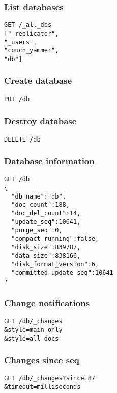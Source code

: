 \begin{multicols}{2}
  
\subsubsection{List databases}
\begin{lstlisting}
GET /_all_dbs 
["_replicator",
"_users",
"couch_yammer",
"db"]
\end{lstlisting}

\subsubsection{Create database}
\begin{lstlisting}
PUT /db
\end{lstlisting}

\subsubsection{Destroy database}
\begin{lstlisting}
DELETE /db
\end{lstlisting}
  
\subsubsection{Database information}
\begin{lstlisting}
GET /db
{
  "db_name":"db",
  "doc_count":188,
  "doc_del_count":14,
  "update_seq":10641,
  "purge_seq":0,
  "compact_running":false,
  "disk_size":839787,
  "data_size":838166,
  "disk_format_version":6,
  "committed_update_seq":10641
}
\end{lstlisting}
  
\subsubsection{Change notifications}
\begin{lstlisting}
GET /db/_changes
&style=main_only
&style=all_docs
\end{lstlisting}
  
\subsubsection{Changes since seq}
\begin{lstlisting}
GET /db/_changes?since=87 
&timeout=milliseconds
\end{lstlisting}
  

\end{multicols}
